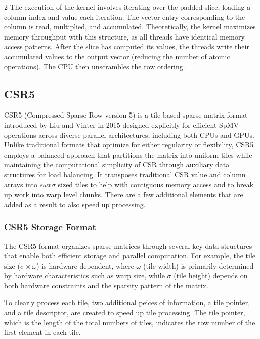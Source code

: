 \documentclass{article}
\begin{document}
\begin{multicols}{2}
The execution of the kernel involves iterating over the padded slice, loading a column index and value each iteration. The vector entry corresponding to the column is read, multiplied, and accumulated. Theoretically, the kernel maximizes memory throughput with this structure, as all threads have identical memory access patterns. After the slice has computed its values, the threads write their accumulated values to the output vector (reducing the number of atomic operations). The CPU then unscrambles the row ordering.

\subsection{CSR5}

CSR5 (Compressed Sparse Row version 5) is a tile-based sparse matrix format introduced by Liu and Vinter in 2015 \cite{Liu2015CSR5} designed explicitly for efficient SpMV operations across diverse parallel architectures, including both CPUs and GPUs. Unlike traditional formats that optimize for either regularity or flexibility, CSR5 employs a balanced approach that partitions the matrix into uniform tiles while maintaining the computational simplicity of CSR through auxiliary data structures for load balancing. It transposes traditional CSR value and column arrays into $s\omega x \sigma$ sized tiles to help with contiguous memory access and to break up work into warp level chunks. There are a few additional elements that are added as a result to also speed up processing.


\subsubsection{CSR5 Storage Format}

The CSR5 format organizes sparse matrices through several key data structures that enable both efficient storage and parallel computation. For example, the tile size ($\sigma \times \omega$) is hardware dependent, where  $\omega$ (tile width) is primarily determined by hardware characteristics such as warp size, while $\sigma$ (tile height) depends on both hardware constraints and the sparsity pattern of the matrix.

To clearly process each tile, two additional peices of information, a tile pointer, and a tile descriptor, are created to speed up tile processing. The tile pointer, which is the length of the total numbers of tiles, indicates the row number of the first element in each tile.


\end{multicols}
\end{document}
